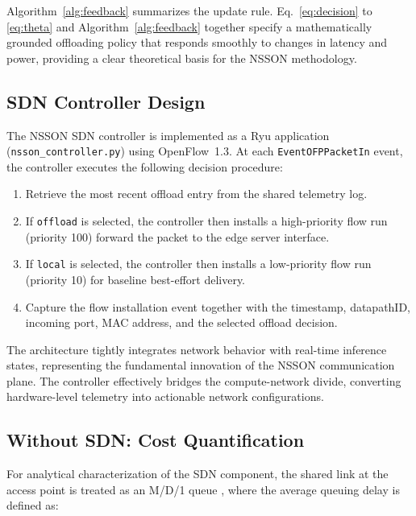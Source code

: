 \documentclass[journal]{IEEEtran}
\begin{document}
Algorithm~\ref{alg:feedback} summarizes the update rule. Eq.~\eqref{eq:decision} to \eqref{eq:theta} and Algorithm~\ref{alg:feedback} together specify a mathematically grounded offloading policy that responds smoothly to changes in latency and power, providing a clear theoretical basis for the NSSON methodology.



\subsection{SDN Controller Design}
\label{sec:sdn_design}
The NSSON SDN controller is implemented as a Ryu application
(\texttt{nsson\_controller.py}) using OpenFlow~1.3. At each
\texttt{EventOFPPacketIn} event, the controller executes the following
decision procedure:
\begin{enumerate}
\item Retrieve the most recent offload entry from the shared telemetry log.
\item If \texttt{offload} is selected, the controller then installs a high-priority flow run (priority 100) forward the packet to the edge server interface.
\item If \texttt{local} is selected, the controller then installs a low-priority flow run (priority 10) for baseline best-effort delivery.
\item Capture the flow installation event together with the timestamp, datapathID, incoming port, MAC address, and the selected offload decision.
\end{enumerate}

The architecture tightly integrates network behavior with real-time inference states, representing the fundamental innovation of the NSSON communication plane. The controller effectively bridges the compute-network divide, converting hardware-level telemetry into actionable network configurations.

\subsection{Without SDN: Cost Quantification}
\label{sec:nosdn}

For analytical characterization of the SDN component, the shared link at the access point is treated as an M/D/1 queue \cite{mancuso2026mind}, where the average queuing delay is defined as:
\end{document}
